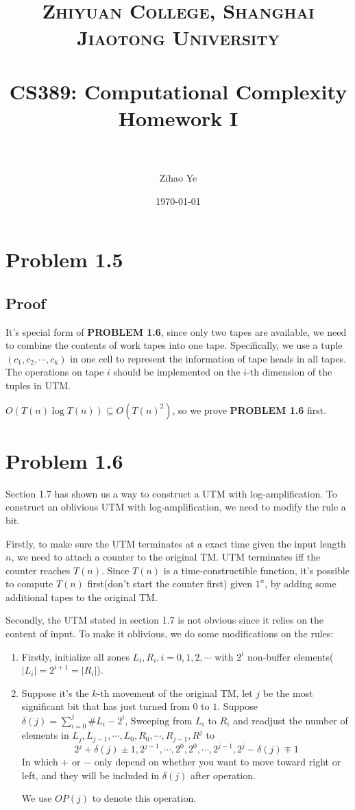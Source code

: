 \documentclass[paper=a4, fontsize=11pt]{scrartcl} %
\title{	
\normalfont \normalsize 
\textsc{Zhiyuan College, Shanghai Jiaotong University} \\ %
\horrule{0.5pt} \\[0.4cm] %
\huge CS389: Computational Complexity Homework I \\ %
\horrule{2pt} \\ %
}
\author{Zihao Ye} %
\date{\normalsize\today} %
\numberwithin{equation}{section} %
\numberwithin{figure}{section} %
\numberwithin{table}{section} %
\begin{document}
\maketitle %

\section*{Problem 1.5}
\subsection*{Proof}
It's special form of \textbf{PROBLEM 1.6}, since only two tapes are available, we need to combine the contents of work tapes into one tape. Specifically, we use a tuple $(c_1, c_2, \cdots, c_k)$ in one cell to represent the information of tape heads in all tapes. The operations on tape $i$ should be implemented on the $i$-th dimension of the tuples in UTM.

$O(T(n)\log T(n)) \subseteq O(T(n)^2)$, so we prove \textbf{PROBLEM 1.6} first.

\section*{Problem 1.6}
Section 1.7 has shown us a way to construct a UTM with log-amplification. To construct an oblivious UTM with log-amplification, we need to modify the rule a bit.

Firstly, to make sure the UTM terminates at a exact time given the input length $n$, we need to attach a counter to the original TM. UTM terminates iff the counter reaches $T(n)$. Since $T(n)$ is a time-constructible function, it's possible to compute $T(n)$ first(don't start the counter first) given $1^n$, by adding some additional tapes to the original TM.

Secondly, the UTM stated in section 1.7 is not obvious since it relies on the content of input. To make it oblivious, we do some modifications on the rules:

\begin{enumerate}
	\item Firstly, initialize all zones $L_i, R_i, i = 0,1,2,\cdots$ with $2^i$ non-buffer elements($|L_i| = 2^{i+1} = |R_i|$).
	\item Suppose it's the $k$-th movement of the original TM, let $j$ be the most significant bit that has just turned from $0$ to $1$. Suppose $\delta(j) = \sum\limits_{i=0}^{j} \#L_i - 2^i$, Sweeping from $L_i$ to $R_i$ and readjust the number of elements in $L_j, L_{j-1}, \cdots, L_0, R_0, \cdots, R_{j-1}, R^{j}$ to $$2^j + \delta(j) \pm 1, 2^{j - 1}, \cdots , 2^{0}, 2^{0}, \cdots, 2^{j-1},  2^{j} - \delta(j) \mp 1$$	
	In which $+$ or $-$ only depend on whether you want to move toward right or left, and they will be included in $\delta(j)$ after operation.

	We use $OP(j)$ to denote this operation.
\end{enumerate}
\end{document}
